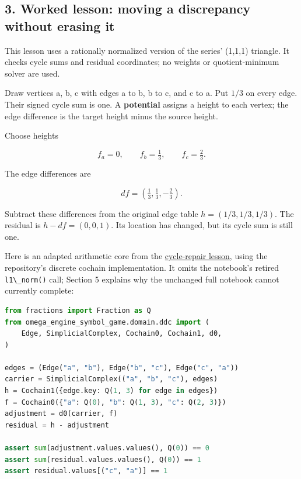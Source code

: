 \documentclass[
  11pt,
]{article}
\newcommand{\passthrough}[1]{#1}
\begin{document}
\subsection{3. Worked lesson: moving a discrepancy without erasing
it}\label{worked-lesson-moving-a-discrepancy-without-erasing-it}

This lesson uses a rationally normalized version of the series' (1,1,1)
triangle. It checks cycle sums and residual coordinates; no weights or
quotient-minimum solver are used.

Draw vertices a, b, c with edges a to b, b to c, and c to a. Put \(1/3\)
on every edge. Their signed cycle sum is one. A \textbf{potential}
assigns a height to each vertex; the edge difference is the target
height minus the source height.

Choose heights

\[
f_a=0,\qquad f_b=\tfrac13,\qquad f_c=\tfrac23.
\]

The edge differences are

\[
df=(\tfrac13,\tfrac13,-\tfrac23).
\]

Subtract these differences from the original edge table
\(h=(1/3,1/3,1/3)\). The residual is \(h-df=(0,0,1)\). Its location has
changed, but its cycle sum is still one.

Here is an adapted arithmetic core from the
\href{https://github.com/dbccpage/the_symbol_game/blob/52cb5457f6c485ba548cfd292f6012a941ed22cf/omega_engine_education/the_symbol_game/lessons/system_integration/100_novices/04_cycle_repair.ipynb}{cycle-repair
lesson}, using the repository's discrete cochain implementation. It
omits the notebook's retired \passthrough{\lstinline!l1\_norm()!} call;
Section 5 explains why the unchanged full notebook cannot currently
complete:

\begin{lstlisting}[language=Python]
from fractions import Fraction as Q
from omega_engine_symbol_game.domain.ddc import (
    Edge, SimplicialComplex, Cochain0, Cochain1, d0,
)

edges = (Edge("a", "b"), Edge("b", "c"), Edge("c", "a"))
carrier = SimplicialComplex(("a", "b", "c"), edges)
h = Cochain1({edge.key: Q(1, 3) for edge in edges})
f = Cochain0({"a": Q(0), "b": Q(1, 3), "c": Q(2, 3)})
adjustment = d0(carrier, f)
residual = h - adjustment

assert sum(adjustment.values.values(), Q(0)) == 0
assert sum(residual.values.values(), Q(0)) == 1
assert residual.values[("c", "a")] == 1
\end{lstlisting}
\end{document}
